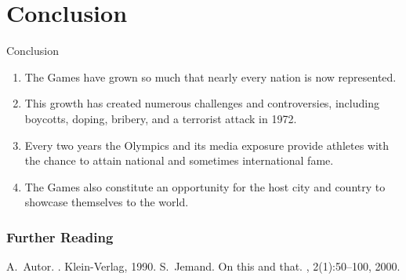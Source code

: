 \documentclass[xcolor=table]{beamer}
\begin{document}
\section{Conclusion}


\begin{frame}{Conclusion}
    \begin{enumerate}
        \item The Games have grown so much that nearly every nation is now represented. 
        \item This growth has created numerous challenges and controversies, including boycotts, doping, bribery, and a terrorist attack in 1972.
        \item  Every two years the Olympics and its media exposure provide athletes with the chance to attain national and sometimes international fame. 
        \item The Games also constitute an opportunity for the host city and country to showcase themselves to the world.
   \end{enumerate}
\end{frame}

\begin{frame}[allowframebreaks]
	\frametitle<presentation>{Further Reading}    
	\begin{thebibliography}{10}    
	\beamertemplatebookbibitems
	  A.~Autor.
	  .
	  \newblock Klein-Verlag, 1990.
	\beamertemplatearticlebibitems
	  S.~Jemand.
	  \newblock On this and that.
	  , 2(1):50--100, 2000.
	\end{thebibliography}
  \end{frame}
\end{document}
